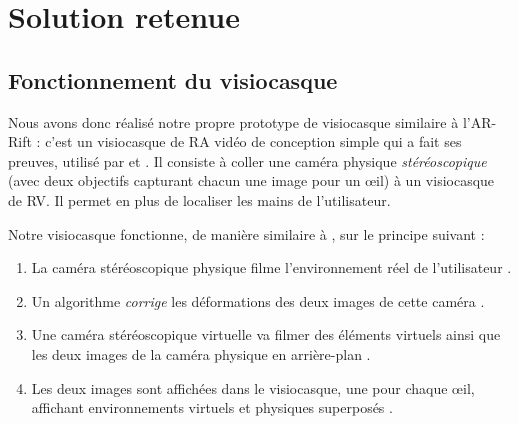 \section{Solution retenue}
\label{sec:prototype}

\subsection{Fonctionnement du visiocasque}
\label{subsec:prototype_operation}
Nous avons donc réalisé notre propre prototype de visiocasque similaire à l'AR-Rift \citep{Steptoe2013} : c'est un visiocasque de RA vidéo de conception simple qui a fait ses preuves, utilisé par \cite{Steptoe2014} et \cite{Piumsomboon2014}. Il consiste à coller une caméra physique \emph{stéréoscopique} (avec deux objectifs capturant chacun une image pour un \oe il) à un visiocasque de RV. Il permet en plus de localiser les mains de l'utilisateur.

Notre visiocasque fonctionne, de manière similaire à \cite{Steptoe2013}, sur le principe suivant :
\begin{enumerate}
  \item La caméra stéréoscopique physique filme l'environnement réel de l'utilisateur .
  \item Un algorithme \emph{corrige} les déformations des deux images de cette caméra .
  \item Une caméra stéréoscopique virtuelle va filmer des éléments virtuels ainsi que les deux images de la caméra physique en arrière-plan .
  \item Les deux images sont affichées dans le visiocasque, une pour chaque \oe il, affichant environnements virtuels et physiques superposés .
\end{enumerate}
\bigskip


